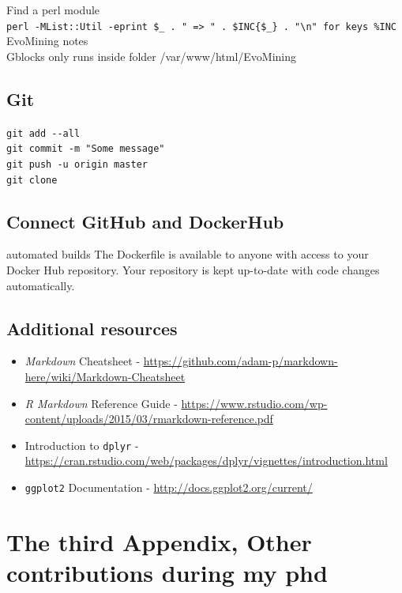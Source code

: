 \documentclass[12pt,twoside]{reedthesis}
\begin{document}
  Find a perl module\\
  \texttt{perl\ -MList::Util\ -e\textquotesingle{}print\ \$\_\ .\ "\ =\textgreater{}\ "\ .\ \$INC\{\$\_\}\ .\ "\textbackslash{}n"\ for\ keys\ \%INC\textquotesingle{}}
  EvoMining notes\\
  Gblocks only runs inside folder /var/www/html/EvoMining
  
  \section{Git}\label{git}
  
  \texttt{git\ add\ -\/-all}\\
  \texttt{git\ commit\ -m\ "Some\ message"}\\
  \texttt{git\ push\ -u\ origin\ master}\\
  \texttt{git\ clone}
  
  \section{Connect GitHub and
  DockerHub}\label{connect-github-and-dockerhub}
  
  automated builds The Dockerfile is available to anyone with access to
  your Docker Hub repository. Your repository is kept up-to-date with code
  changes automatically.
  
  \section{Additional resources}\label{additional-resources}
  
  \begin{itemize}
  \item
    \emph{Markdown} Cheatsheet -
    \url{https://github.com/adam-p/markdown-here/wiki/Markdown-Cheatsheet}
  \item
    \emph{R Markdown} Reference Guide -
    \url{https://www.rstudio.com/wp-content/uploads/2015/03/rmarkdown-reference.pdf}
  \item
    Introduction to \texttt{dplyr} -
    \url{https://cran.rstudio.com/web/packages/dplyr/vignettes/introduction.html}
  \item
    \texttt{ggplot2} Documentation -
    \url{http://docs.ggplot2.org/current/}
  \end{itemize}
  
  \chapter{The third Appendix, Other contributions during my
  phd}\label{the-third-appendix-other-contributions-during-my-phd}
  
\end{document}
